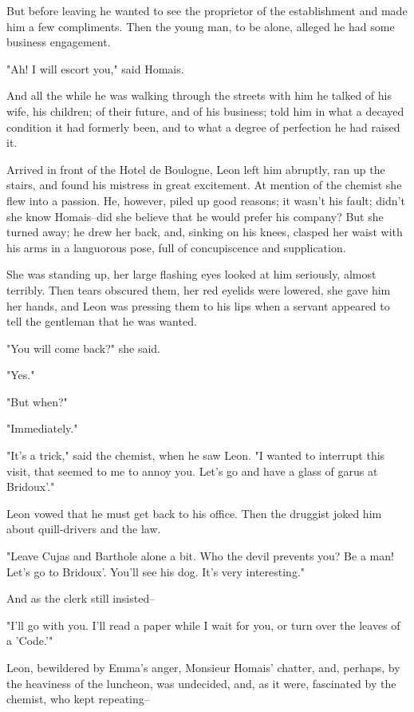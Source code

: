 \documentclass[11pt,twocolumn]{ltugboat}
\begin{document}
But before leaving he wanted to see the proprietor of the establishment
and made him a few compliments. Then the young man, to be alone, alleged
he had some business engagement.

"Ah! I will escort you," said Homais.

And all the while he was walking through the streets with him he talked
of his wife, his children; of their future, and of his business; told
him in what a decayed condition it had formerly been, and to what a
degree of perfection he had raised it.

Arrived in front of the Hotel de Boulogne, Leon left him abruptly, ran
up the stairs, and found his mistress in great excitement. At mention of
the chemist she flew into a passion. He, however, piled up good reasons;
it wasn't his fault; didn't she know Homais--did she believe that he
would prefer his company? But she turned away; he drew her back, and,
sinking on his knees, clasped her waist with his arms in a languorous
pose, full of concupiscence and supplication.

She was standing up, her large flashing eyes looked at him seriously,
almost terribly. Then tears obscured them, her red eyelids were lowered,
she gave him her hands, and Leon was pressing them to his lips when a
servant appeared to tell the gentleman that he was wanted.

"You will come back?" she said.

"Yes."

"But when?"

"Immediately."

"It's a trick," said the chemist, when he saw Leon. "I wanted to
interrupt this visit, that seemed to me to annoy you. Let's go and have
a glass of garus at Bridoux'."

Leon vowed that he must get back to his office. Then the druggist joked
him about quill-drivers and the law.

"Leave Cujas and Barthole alone a bit. Who the devil prevents you? Be a
man! Let's go to Bridoux'. You'll see his dog. It's very interesting."

And as the clerk still insisted--

"I'll go with you. I'll read a paper while I wait for you, or turn over
the leaves of a 'Code.'"

Leon, bewildered by Emma's anger, Monsieur Homais' chatter, and,
perhaps, by the heaviness of the luncheon, was undecided, and, as it
were, fascinated by the chemist, who kept repeating--
\end{document}
